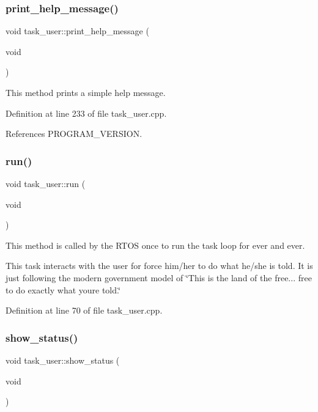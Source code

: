 \subsubsection{\texorpdfstring{print\+\_\+help\+\_\+message()}{print\_help\_message()}}
{\footnotesize\ttfamily void task\+\_\+user\+::print\+\_\+help\+\_\+message (\begin{DoxyParamCaption}\item[{void}]{ }\end{DoxyParamCaption})\hspace{0.3cm}{\ttfamily [protected]}}

This method prints a simple help message. 

Definition at line 233 of file task\+\_\+user.\+cpp.



References P\+R\+O\+G\+R\+A\+M\+\_\+\+V\+E\+R\+S\+I\+ON.

\mbox{\label{classtask__user_adca6429d57be25e8d411414fc8ad75af}} 
\subsubsection{\texorpdfstring{run()}{run()}}
{\footnotesize\ttfamily void task\+\_\+user\+::run (\begin{DoxyParamCaption}\item[{void}]{ }\end{DoxyParamCaption})}

This method is called by the R\+T\+OS once to run the task loop for ever and ever.

This task interacts with the user for force him/her to do what he/she is told. It is just following the modern government model of \char`\"{}\+This is the land of the free...
free to do exactly what you\textquotesingle{}re told.\char`\"{} 

Definition at line 70 of file task\+\_\+user.\+cpp.

\mbox{\label{classtask__user_a105bebbd9cb1031154c3dfc3662db4a0}} 
\subsubsection{\texorpdfstring{show\+\_\+status()}{show\_status()}}
{\footnotesize\ttfamily void task\+\_\+user\+::show\+\_\+status (\begin{DoxyParamCaption}\item[{void}]{ }\end{DoxyParamCaption})\hspace{0.3cm}{\ttfamily [protected]}}

